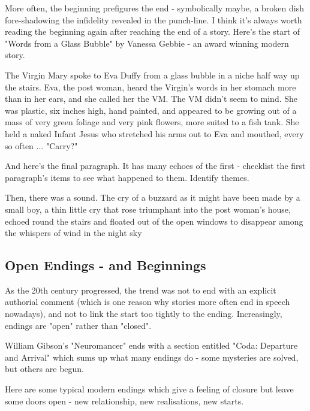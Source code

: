 \documentclass[11pt]{article}
\newenvironment{narrow}[2]{%
 \begin{list}{}{%
  \setlength{\topsep}{0pt}%
  \setlength{\leftmargin}{#1}%
  \setlength{\rightmargin}{#2}%
  \setlength{\listparindent}{\parindent}%
  \setlength{\itemindent}{\parindent}%
  \setlength{\parsep}{\parskip}%
 }%
\item[]}{\end{list}}
\begin{document}
More often, the beginning prefigures the end - symbolically maybe, a broken dish fore-shadowing the infidelity revealed in the punch-line. I think it's always worth reading the beginning again after reaching the end of a story. Here's the start of "Words from a Glass Bubble" by Vanessa Gebbie - an award winning modern story. 

\begin{narrow}{1.0cm}{1.0cm}
The Virgin Mary spoke to Eva Duffy from a glass bubble in a niche half way 
up the stairs. Eva, the post woman, heard the Virgin's words in her stomach 
more than in her ears, and she called her the VM. The VM didn't seem to mind. 
She was plastic, six inches high, hand painted, and appeared to be growing out 
of a mass of very green foliage and very pink flowers, more suited to a fish 
tank. She held a naked Infant Jesus who stretched his arms out to Eva and 
mouthed, every so often ... "Carry?"
\end{narrow}

And here's the final paragraph. It has many echoes of the first - checklist the first paragraph's items to see what happened to them. Identify themes.

\begin{narrow}{1.0cm}{1.0cm}
Then, there was a sound. The cry of a buzzard as it might have been made by 
a small boy, a thin little cry that rose triumphant into the post woman's 
house, echoed round the stairs and floated out of the open windows to 
disappear among the whispers of wind in the night sky
\end{narrow}




\subsection*{Open Endings - and Beginnings}

As the 20th century progressed, the trend was not to end with an explicit authorial comment (which is one reason why stories more often end in speech nowadays), and not to link the start too tightly to the ending. Increasingly, endings are "open" rather than "closed".




William Gibson's "Neuromancer" ends with a section entitled "Coda: Departure and Arrival" which sums up what many endings do - some mysteries are solved, but others are begun.




Here are some typical modern endings which give a feeling of closure but leave some doors open - new relationship, new realisations, new starts.
\end{document}
